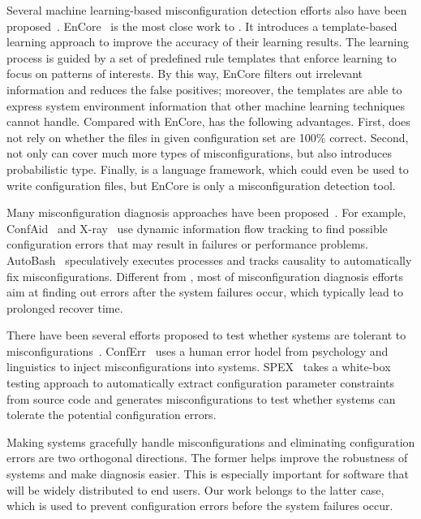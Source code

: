 Several machine learning-based misconfiguration detection efforts 
also have been proposed~\cite{yuan11context, zhang14encore}.
EnCore~\cite{zhang14encore} is the most close work to \app.
It introduces a template-based
learning approach to improve the accuracy of their learning results.
The learning process is guided by a set of predefined rule templates
that enforce learning to focus on patterns of interests.
By this way, EnCore filters out irrelevant information and reduces
the false positives; moreover, the templates are able to express
system environment information that other machine learning
techniques cannot handle.
Compared with EnCore, \app has the following advantages.
First, \app does not rely on whether the files in given configuration set 
are 100\% correct. Second, \app not only can cover much more types of 
misconfigurations, but also introduces probabilistic type.
Finally, \app is a language framework, which could 
even be used to write configuration files, but EnCore is only a 
misconfiguration detection tool.

Many misconfiguration diagnosis approaches have been proposed~\cite{}.
For example, ConfAid~\cite{} and X-ray~\cite{} use dynamic information
flow tracking to find possible configuration errors that may result in
failures or performance problems. AutoBash~\cite{} speculatively
executes processes and tracks causality to automatically fix 
misconfigurations. Different from \app, most of misconfiguration
diagnosis efforts aim at finding out errors after the system
failures occur, which typically lead to prolonged recover time.

There have been several efforts proposed to test whether systems are 
tolerant to misconfigurations~\cite{xu13do}. 
ConfErr~\cite{} uses a human error hodel from psychology and
linguistics to inject misconfigurations into systems.
SPEX~\cite{xu13do} takes a white-box testing approach to automatically
extract configuration parameter constraints from source code and generates 
misconfigurations to test whether systems can tolerate the potential
configuration errors.

Making systems gracefully handle misconfigurations and eliminating
configuration errors are two orthogonal directions.
The former helps improve the robustness of systems and make 
diagnosis easier. This is especially important for 
software that will be widely distributed to end users.
Our work belongs to the latter case, which is used to 
prevent configuration errors before the system failures occur.

